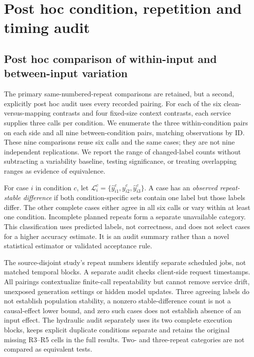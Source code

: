 \documentclass[11pt,a4paper]{article}
\begin{document}
\section{Post hoc condition, repetition and timing audit}
\subsection{Post hoc comparison of within-input and between-input variation}
The primary same-numbered-repeat comparisons are retained, but a second, explicitly post hoc audit uses every recorded pairing. For each of the six clean-versus-mapping contrasts and four fixed-size context contrasts, each service supplies three calls per condition. We enumerate the three within-condition pairs on each side and all nine between-condition pairs, matching observations by ID. These nine comparisons reuse six calls and the same cases; they are not nine independent replications. We report the range of changed-label counts without subtracting a variability baseline, testing significance, or treating overlapping ranges as evidence of equivalence.

For case $i$ in condition $c$, let $\mathcal L_i^c=\{\hat y_{i1}^c,\hat y_{i2}^c,\hat y_{i3}^c\}$. A case has an \emph{observed repeat-stable difference} if both condition-specific sets contain one label but those labels differ. The other complete cases either agree in all six calls or vary within at least one condition. Incomplete planned repeats form a separate unavailable category. This classification uses predicted labels, not correctness, and does not select cases for a higher accuracy estimate. It is an audit summary rather than a novel statistical estimator or validated acceptance rule.

The source-disjoint study's repeat numbers identify separate scheduled jobs, not matched temporal blocks. A separate audit checks client-side request timestamps. All pairings contextualize finite-call repeatability but cannot remove service drift, unexposed generation settings or hidden model updates. Three agreeing labels do not establish population stability, a nonzero stable-difference count is not a causal-effect lower bound, and zero such cases does not establish absence of an input effect. The hydraulic audit separately uses its two complete execution blocks, keeps explicit duplicate conditions separate and retains the original missing R3--R5 cells in the full results. Two- and three-repeat categories are not compared as equivalent tests.
\end{document}
